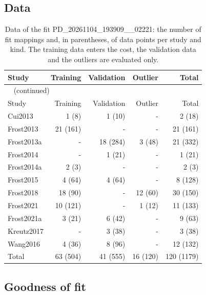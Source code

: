 \documentclass{article}
\begin{document}
\subsection{Data}

\begin{longtable}{lrrrr}
\caption{Data of the fit PD\_20261104\_193909\_\_02221: the number of fit mappings and, in parentheses, of data points per study and kind. The training data enters the cost, the validation data and the outliers are evaluated only.}\label{tab:data:PD_20261104_193909__02221} \\
\toprule
Study & Training & Validation & Outlier & Total \\
\midrule
\endfirsthead
\multicolumn{5}{l}{\small\tablename~\thetable{} (continued)} \\
\toprule
Study & Training & Validation & Outlier & Total \\
\midrule
\endhead
\bottomrule
\endlastfoot
Cui2013 & 1 (8) & 1 (10) & - & 2 (18) \\
Frost2013 & 21 (161) & - & - & 21 (161) \\
Frost2013a & - & 18 (284) & 3 (48) & 21 (332) \\
Frost2014 & - & 1 (21) & - & 1 (21) \\
Frost2014a & 2 (3) & - & - & 2 (3) \\
Frost2015 & 4 (64) & 4 (64) & - & 8 (128) \\
Frost2018 & 18 (90) & - & 12 (60) & 30 (150) \\
Frost2021 & 10 (121) & - & 1 (12) & 11 (133) \\
Frost2021a & 3 (21) & 6 (42) & - & 9 (63) \\
Kreutz2017 & - & 3 (38) & - & 3 (38) \\
Wang2016 & 4 (36) & 8 (96) & - & 12 (132) \\
Total & 63 (504) & 41 (555) & 16 (120) & 120 (1179) \\
\end{longtable}

\subsection{Goodness of fit}
\end{document}
